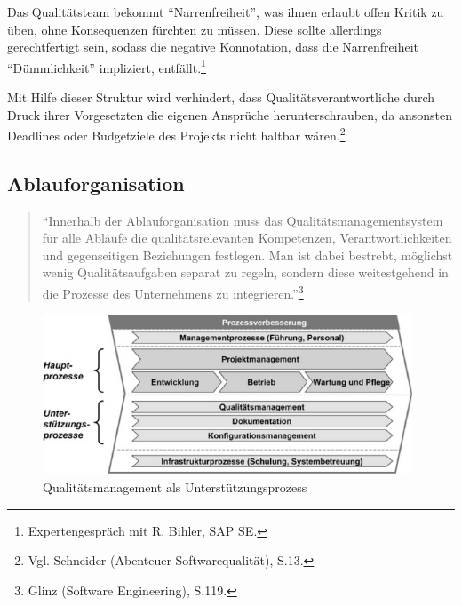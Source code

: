             Das Qualitätsteam bekommt \enquote{Narrenfreiheit}, was ihnen erlaubt offen Kritik zu üben, ohne Konsequenzen fürchten zu müssen. Diese sollte allerdings gerechtfertigt sein, sodass die negative Konnotation, dass die Narrenfreiheit \enquote{Dümmlichkeit} impliziert, entfällt.\footnote{Expertengespräch mit R. Bihler, SAP SE.}

            Mit Hilfe dieser Struktur wird verhindert, dass Qualitätsverantwortliche durch Druck ihrer Vorgesetzten die eigenen Ansprüche herunterschrauben, da ansonsten Deadlines oder Budgetziele des Projekts nicht haltbar wären.\footnote{Vgl. Schneider (Abenteuer Softwarequalität), S.13.}

        \subsection{Ablauforganisation}

            \begin{quote}
                \enquote{Innerhalb der Ablauforganisation muss das Qualitätsmanagementsystem für alle Abläufe die qualitätsrelevanten Kompetenzen, Verantwortlichkeiten und gegenseitigen Beziehungen festlegen. Man ist dabei bestrebt, möglichst wenig Qualitätsaufgaben separat zu regeln, sondern diese weitestgehend in die Prozesse des Unternehmens zu integrieren.}\footnote{Glinz (Software Engineering), S.119.}
            \end{quote}

            \begin{figure}[!htbp]
                \begin{center}
                    \includegraphics[width=11cm]{Abbildungen/ablaufqs}
                    \caption[Qualitätsmanagement als Unterstützungsprozess]{Qualitätsmanagement als Unterstützungsprozess\protect\footnotemark}
                    \label{abb:ablaufqs}
                \end{center}
            \end{figure}


